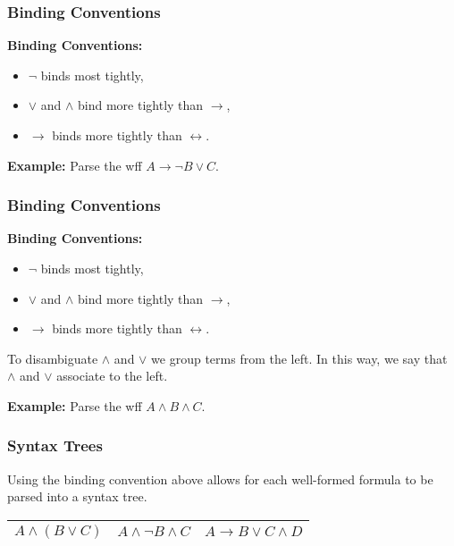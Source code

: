 \documentclass{beamer}
\theoremstyle{indentDefn} \newtheorem{defn}[]{Definition}
\begin{document}
\begin{frame}
	\frametitle{Binding Conventions}
			
	{\bf Binding Conventions:} %
	\begin{itemize}
		\item $\lnot$ binds most tightly, 
		\item $\lor$ and $\land$ bind more tightly than $\rightarrow$,
		\item $\rightarrow$ binds more tightly than $\leftrightarrow$. 			
	\end{itemize}

	\vspace{0.2cm}

	{\bf Example:} Parse the wff $A \to \lnot B \lor C$.

	\vspace{2cm}

\end{frame}

\begin{frame}
	\frametitle{Binding Conventions}
			
	{\bf Binding Conventions:} %
	\begin{itemize}
		\item $\lnot$ binds most tightly, 
		\item $\lor$ and $\land$ bind more tightly than $\rightarrow$,
		\item $\rightarrow$ binds more tightly than $\leftrightarrow$. 			
	\end{itemize}

	To disambiguate $\land$ and $\lor$ we group terms from the left. In this way, we say that $\land$ and $\lor$ associate to the left. 

	{\bf Example:} Parse the wff $A \land B \land C$.

	\vspace{2cm}

\end{frame}

\begin{frame}
	\frametitle{Syntax Trees}

	Using the binding convention above allows for each well-formed formula to be parsed into a syntax tree. 

	\begin{table}[h]
		\centering
		\begin{tabular}{c c c}
			$A \land (B \lor C)$ \hspace{1.5cm} & $A \land \lnot B \land C$ \hspace{1cm} & $A \to B \lor C \land D$ \\
			\hline
		\end{tabular}
	\end{table}
	\vspace{4cm}
\end{frame}
\end{document}
